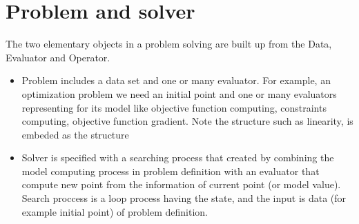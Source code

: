 \documentclass{report}
\begin{document}
\section{Problem and solver}
\par The two elementary objects in a problem solving are built up from the Data, Evaluator and Operator.
\begin{itemize}
\item Problem includes a data set and one or many evaluator. For example, an optimization problem we need 
  an initial point and one or many evaluators representing for its model like objective 
  function computing, constraints computing, objective function gradient. Note the structure such as linearity, 
  is embeded as the structure 
\item Solver is specified with a searching process that created by combining the model computing process in 
  problem definition with an evaluator that compute new point from the information of current point (or model value).
  Search proccess is a loop process having the state, and the input is data (for example initial point) of 
  problem definition.
\end{itemize}
\end{document}
